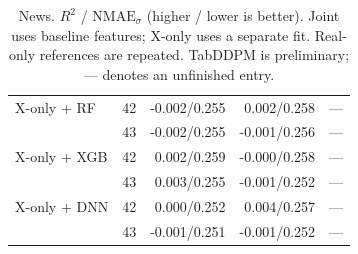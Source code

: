 \begin{table}[ht]
{\begin{tabular}{lrrrr}
X-only + RF & 42 & -0.002/0.255 & 0.002/0.258 & --- \\
 & 43 & -0.002/0.255 & -0.001/0.256 & --- \\
X-only + XGB & 42 & 0.002/0.259 & -0.000/0.258 & --- \\
 & 43 & 0.003/0.255 & -0.001/0.252 & --- \\
X-only + DNN & 42 & 0.000/0.252 & 0.004/0.257 & --- \\
 & 43 & -0.001/0.251 & -0.001/0.252 & --- \\
\bottomrule
\end{tabular}
}
\caption{News. $R^2$ / $\mathrm{NMAE}_{\sigma}$ (higher / lower is better). Joint uses baseline features; X-only uses a separate fit. Real-only references are repeated. TabDDPM is preliminary; --- denotes an unfinished entry.}
\label{tab:news}
\end{table}
